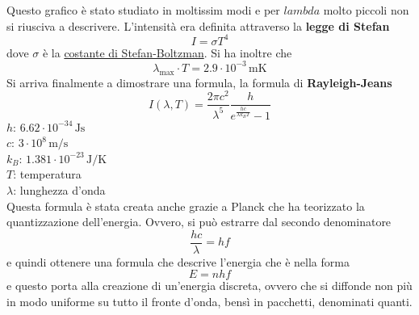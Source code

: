 Questo grafico è stato studiato in moltissim modi e per $lambda$ molto piccoli non si riusciva a
descrivere. L'intensità era definita attraverso la \textbf{legge di Stefan}
\begin{equation*}
  I = \sigma T^4
\end{equation*}
dove $\sigma$ è la \hyperref[tab:sigma]{costante di Stefan-Boltzman}. Si ha inoltre che
\begin{equation*}
  \lambda_{\text{max}}\cdot T=2.9\cdot10^{-3}\,\text{mK}
\end{equation*}
Si arriva finalmente a dimostrare una formula, la formula di \textbf{Rayleigh-Jeans}
\begin{equation*}
  I(\lambda,T) = \frac{2\pi c^2}{\lambda^5} \frac{h}{e^{\frac{hc}{\lambda k_B T}}-1}
\end{equation*}
\hyperref[tab:h]{$h$}: $6.62\cdot10^{-34}\,\text{Js}$\\
\hyperref[tab:c]{$c$}: $3\cdot10^8\,\text{m/s}$\\
\hyperref[tab:kB]{$k_B$}: $1.381\cdot10^{-23}\,\text{J/K}$\\
$T$: temperatura\\
$\lambda$: lunghezza d'onda\\ [\baselineskip]
Questa formula è stata creata anche grazie a Planck che ha teorizzato la quantizzazione dell'energia.
Ovvero, si può estrarre dal secondo denominatore
\begin{equation*}
  \frac{hc}{\lambda}=hf
\end{equation*}
e quindi ottenere una formula che descrive l'energia che è nella forma
\begin{equation*}
  E = nhf
\end{equation*}
e questo porta alla creazione di un'energia discreta, ovvero che si diffonde non più in modo uniforme
su tutto il fronte d'onda, bensì in pacchetti, denominati quanti.

